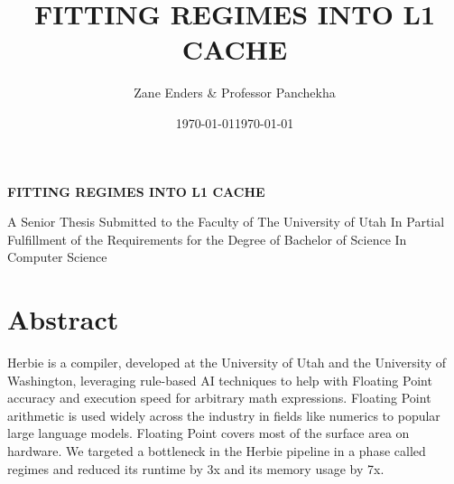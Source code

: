 \documentclass{article}
\title{\uppercase{Fitting Regimes into L1 cache}}
\author{Zane Enders & Professor Panchekha}
\date{\today}
\begin{document}
\begin{titlepage}
    \begin{center}
    

       \vspace*{1cm}

        \textbf{\uppercase{Fitting Regimes into L1 cache}}

       \vspace{0.5cm}
       
       
       \date{\today}
            
       \vspace{1.5cm}

   
        A Senior Thesis Submitted to the Faculty of 
        The University of Utah
        In Partial Fulfillment of the Requirements for the
        Degree of Bachelor of Science
        In
        Computer Science
            
       \vspace{0.8cm}
            
       \vfill
    \end{center}
\end{titlepage}
\newpage


\section{Abstract}
Herbie\cite{Herbie} is a compiler, developed at the University of Utah and the University of Washington,  leveraging rule-based AI techniques to help with Floating Point accuracy and execution speed for arbitrary math expressions. Floating Point arithmetic is used widely across the industry in fields like numerics to popular large language models. Floating Point covers most of the surface area on hardware. We targeted a bottleneck in the Herbie pipeline in a phase called regimes and reduced its runtime by 3x and its memory usage by 7x.
\end{document}
